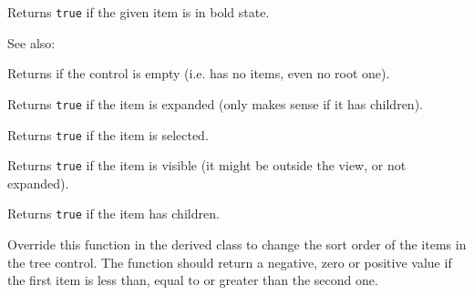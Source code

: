 

\label{wxtreectrlisbold}


Returns {\tt true} if the given item is in bold state.

See also: 


\label{wxtreectrlisempty}


Returns \true if the control is empty (i.e. has no items, even no root one).


\label{wxtreectrlisexpanded}


Returns {\tt true} if the item is expanded (only makes sense if it has children).


\label{wxtreectrlisselected}


Returns {\tt true} if the item is selected.


\label{wxtreectrlisvisible}


Returns {\tt true} if the item is visible (it might be outside the view, or not expanded).


\label{wxtreectrlitemhaschildren}


Returns {\tt true} if the item has children.


\label{wxtreectrloncompareitems}


Override this function in the derived class to change the sort order of the
items in the tree control. The function should return a negative, zero or
positive value if the first item is less than, equal to or greater than the
second one.


